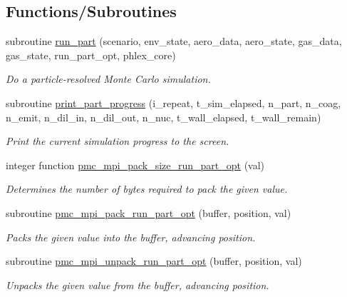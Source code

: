 \subsection*{Functions/\+Subroutines}
\begin{DoxyCompactItemize}
\item 
subroutine \mbox{\hyperlink{namespacepmc__run__part_af2f5c765b1f86663d85b7ca882325eca}{run\+\_\+part}} (scenario, env\+\_\+state, aero\+\_\+data, aero\+\_\+state, gas\+\_\+data, gas\+\_\+state, run\+\_\+part\+\_\+opt, phlex\+\_\+core)
\begin{DoxyCompactList}\small\item\em Do a particle-\/resolved Monte Carlo simulation. \end{DoxyCompactList}\item 
subroutine \mbox{\hyperlink{namespacepmc__run__part_a78a61c036c01bfc2a51ef82319cfa1ef}{print\+\_\+part\+\_\+progress}} (i\+\_\+repeat, t\+\_\+sim\+\_\+elapsed, n\+\_\+part, n\+\_\+coag, n\+\_\+emit, n\+\_\+dil\+\_\+in, n\+\_\+dil\+\_\+out, n\+\_\+nuc, t\+\_\+wall\+\_\+elapsed, t\+\_\+wall\+\_\+remain)
\begin{DoxyCompactList}\small\item\em Print the current simulation progress to the screen. \end{DoxyCompactList}\item 
integer function \mbox{\hyperlink{namespacepmc__run__part_ae9658ba7f39866fd66db89befeb7e24d}{pmc\+\_\+mpi\+\_\+pack\+\_\+size\+\_\+run\+\_\+part\+\_\+opt}} (val)
\begin{DoxyCompactList}\small\item\em Determines the number of bytes required to pack the given value. \end{DoxyCompactList}\item 
subroutine \mbox{\hyperlink{namespacepmc__run__part_ab2ea939c65074559a8e6f98626ec07b7}{pmc\+\_\+mpi\+\_\+pack\+\_\+run\+\_\+part\+\_\+opt}} (buffer, position, val)
\begin{DoxyCompactList}\small\item\em Packs the given value into the buffer, advancing position. \end{DoxyCompactList}\item 
subroutine \mbox{\hyperlink{namespacepmc__run__part_ab6674f0051ea8191191000e82158faa1}{pmc\+\_\+mpi\+\_\+unpack\+\_\+run\+\_\+part\+\_\+opt}} (buffer, position, val)
\begin{DoxyCompactList}\small\item\em Unpacks the given value from the buffer, advancing position. \end{DoxyCompactList}\end{DoxyCompactItemize}
